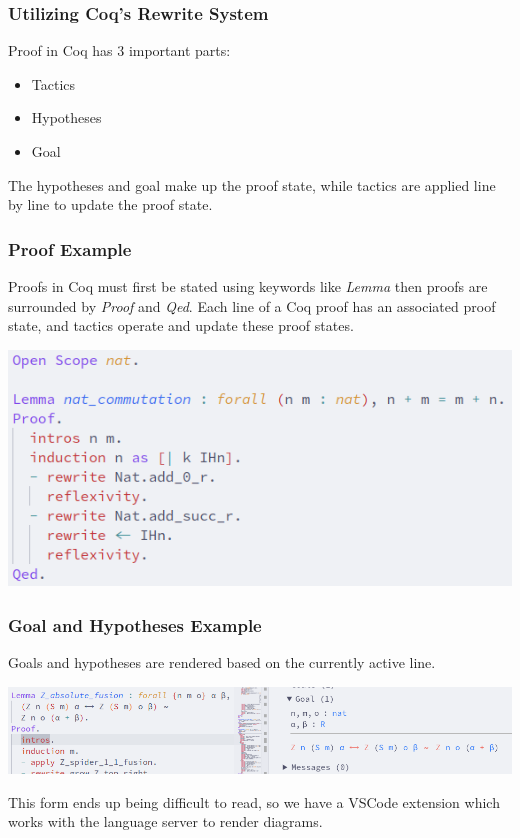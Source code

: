 \documentclass{beamer}
\begin{document}
\begin{frame}
  \frametitle{Utilizing Coq's Rewrite System}

  Proof in Coq has 3 important parts:
  \begin{itemize}
    \item Tactics
    \item Hypotheses
    \item Goal
  \end{itemize}

  The hypotheses and goal make up the proof state, while tactics are applied line by line to update the proof state.

\end{frame}

\begin{frame}
  \frametitle{Proof Example}

  Proofs in Coq must first be stated using keywords like \textit{Lemma} then proofs are surrounded by \textit{Proof} and \textit{Qed}.
  Each line of a Coq proof has an associated proof state, and tactics operate and update these proof states.

  \includegraphics[width = \linewidth]{figures/coqproof.png}

\end{frame}

\begin{frame}
  \frametitle{Goal and Hypotheses Example}

  Goals and hypotheses are rendered based on the currently active line.

  \includegraphics[width = \linewidth]{figures/goalhypotheses.png}

  This form ends up being difficult to read, so we have a VSCode extension which works with the language server to render diagrams.

\end{frame}
\end{document}
